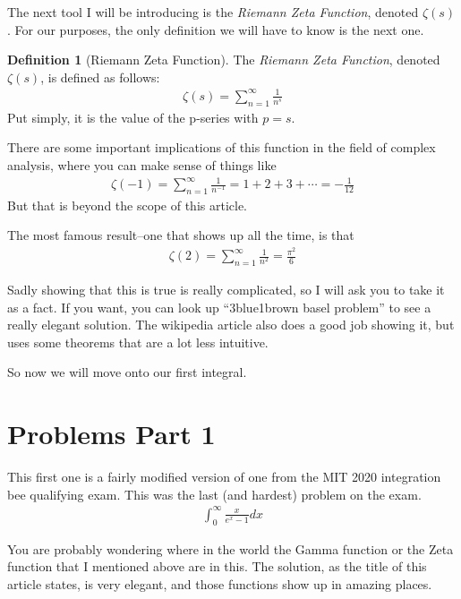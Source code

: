 \documentclass[12pt]{article}
\theoremstyle{definition}
\newtheorem{definition}{Definition}[section]
\theoremstyle{remark}
\newcommand{\indef}{\int_{0}^{\infty}}
\begin{document}
    The next tool I will be introducing is the \textit{Riemann Zeta Function}, denoted $\zeta(s)$. 
    For our purposes, the only definition we will have to know is the next one.

    \begin{definition}[Riemann Zeta Function]\label{Zeta}
        The \textit{Riemann Zeta Function}, denoted $\zeta(s)$, is defined as follows:
        \begin{align*}
           \zeta(s) = \sum_{n=1}^{\infty} \frac{1}{n^s}
        \end{align*}
        Put simply, it is the value of the p-series with $p = s$.
    \end{definition}

    There are some important implications of this function in the field of complex analysis, where you can make sense of things like
    \begin{align*}
        \zeta(-1) = \sum_{n=1}^{\infty} \frac{1}{n^{-1}} = 1 + 2 + 3 + \cdots = -\frac{1}{12}
    \end{align*}
    But that is beyond the scope of this article.

    The most famous result--one that shows up all the time, is that
    \begin{align*}
        \zeta(2) = \sum_{n=1}^{\infty} \frac{1}{n^2} = \frac{\pi^2}{6}
    \end{align*}

    Sadly showing that this is true is really complicated, so I will ask you to take it as a fact.
    If you want, you can look up ``3blue1brown basel problem'' to see a really elegant solution.
    The wikipedia article also does a good job showing it, but uses some theorems that are a lot less intuitive.

    So now we will move onto our first integral.

    \section{Problems Part 1}
    This first one is a fairly modified version of one from the MIT 2020 integration bee qualifying exam.
    This was the last (and hardest) problem on the exam.
    \begin{align*}
        \indef \frac{x}{e^x-1}dx
    \end{align*}

    You are probably wondering where in the world the Gamma function or the Zeta function that I mentioned above are in this.
    The solution, as the title of this article states, is very elegant, and those functions show up in amazing places.
\end{document}
